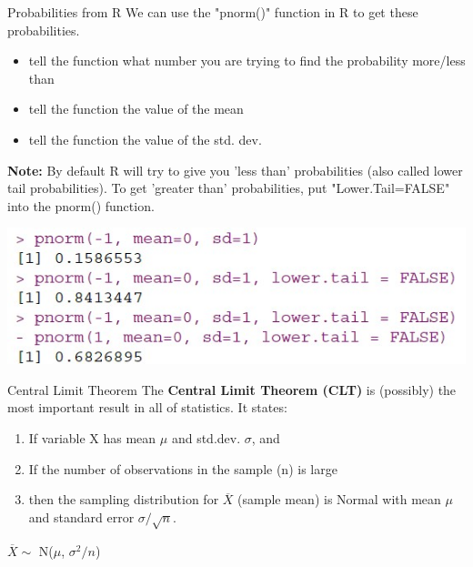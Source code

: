 \documentclass{beamer}
\begin{document}
\begin{frame}{Probabilities from R}
We can use the "pnorm()" function in R to get these probabilities.
\begin{itemize}
    \item tell the function what number you are trying to find the probability more/less than
    \item tell the function the value of the mean
    \item tell the function the value of the std. dev.
\end{itemize} \vspace{2mm}

\scriptsize{\textbf{Note:} By default R will try to give you 'less than' probabilities (also called lower tail probabilities). To get 'greater than' probabilities, put "Lower.Tail=FALSE" into the pnorm() function.} \vspace{2mm}

\begin{center}
    \includegraphics[scale=1]{img/pnorm_R_example.jpg}
\end{center}
\end{frame}

\begin{frame}{Central Limit Theorem}
The \textbf{Central Limit Theorem (CLT)} is (possibly) the most important result in all of statistics. It states:
\begin{enumerate}
    \item If variable X has mean $\mu$ and std.dev. $\sigma$, and
    \item If the number of observations in the sample (n) is large
    \item then the sampling distribution for $\overline{X}$ (sample mean) is Normal with mean $\mu$ and standard error $\sigma / \sqrt{n}$.
\end{enumerate}
\begin{center}
    $\overline{X} \sim$ N($\mu$, $\sigma^2 / n$)
\end{center}
\end{frame}
\end{document}
